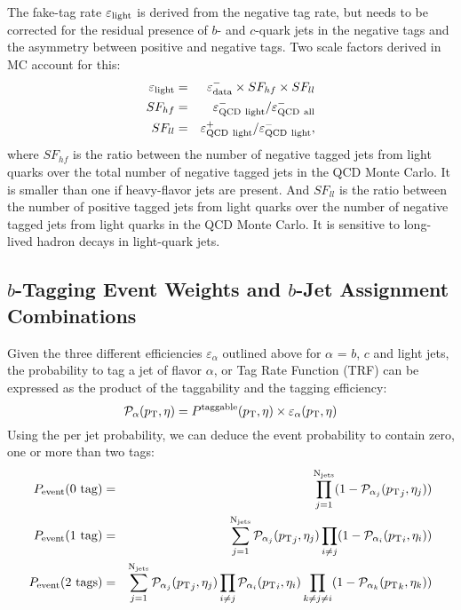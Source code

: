 \vspace{0.1in}
The fake-tag rate $\varepsilon_{\rm light}$ is derived from the
negative tag rate, but needs to be corrected for the residual presence
of $b$- and $c$-quark jets in the negative tags and the asymmetry
between positive and negative tags. Two scale factors derived in MC
account for this:
\begin{eqnarray*}
\varepsilon_{\rm light}
& = & \varepsilon^{-}_{\rm data} \times SF_{hf} \times SF_{ll} \\
SF_{hf}
& = & \varepsilon^{-}_{\rm QCD~light}/\varepsilon^{-}_{\rm QCD~all} \\
SF_{ll}
& = & \varepsilon^{+}_{\rm QCD~light}/\varepsilon^{-}_{\rm QCD~light},
\end{eqnarray*}
where $SF_{hf}$ is the ratio between the number of negative tagged
jets from light quarks over the total number of negative tagged jets
in the QCD Monte Carlo. It is smaller than one if heavy-flavor jets
are present. And $SF_{ll}$ is the ratio between the number of positive
tagged jets from light quarks over the number of negative tagged jets
from light quarks in the QCD Monte Carlo. It is sensitive to
long-lived hadron decays in light-quark jets.


\subsection{$b$-Tagging Event Weights and $b$-Jet Assignment
Combinations}
\label{permuter}

Given the three different efficiencies $\varepsilon_{\alpha}$ outlined
above for $\alpha$ = $b$, $c$ and light jets, the probability to tag a
jet of flavor $\alpha$, or Tag Rate Function (TRF) can be expressed as
the product of the taggability and the tagging efficiency:
$$
\mathcal{P}_{\alpha}(\mbox{$p_{\rm T}$},\eta) = P^{\rm taggable}(\mbox{$p_{\rm T}$},\eta)\times \varepsilon_{\alpha}(\mbox{$p_{\rm T}$},\eta)
$$
Using the per jet probability, we can deduce the event probability
to contain zero, one or more than two tags:
\begin{eqnarray*}
P_{\rm event}(0~{\rm tag}) & = & \prod_{j=1}^{\rm N_{jets}}(1 - \mathcal{P}_{\alpha_j}(\mbox{$p_{\rm T}$}_j,\eta_j)) \\
P_{\rm event}(1~{\rm tag}) & = & \sum_{j=1}^{\rm
N_{jets}}\mathcal{P}_{\alpha_j}(\mbox{$p_{\rm T}$}_j,\eta_j) \prod_{i\neq j}(1 - \mathcal{P}_{\alpha_i}(\mbox{$p_{\rm T}$}_i,\eta_i)) \\
P_{\rm event}(2~{\rm tags}) & = &
\sum_{j=1}^{\rm N_{jets}}\mathcal{P}_{\alpha_j}(\mbox{$p_{\rm T}$}_j,\eta_j)
\prod_{i\neq j}\mathcal{P}_{\alpha_i}(\mbox{$p_{\rm T}$}_i,\eta_i)
\prod_{k\neq j \neq i}(1 - \mathcal{P}_{\alpha_k}(\mbox{$p_{\rm T}$}_k,\eta_k))
\end{eqnarray*}

